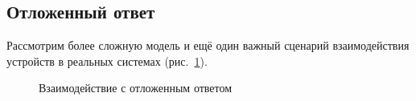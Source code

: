 % 
% 
% 
% 
% 

\subsection{Отложенный ответ}

Рассмотрим более сложную модель и ещё один важный сценарий взаимодействия устройств в реальных системах (рис. \ref{fig:delayed-response}).

\begin{figure}[htp]
    \centering
    \caption[Взаимодействие с отложенным ответом]{Взаимодействие с отложенным ответом}
    \label{fig:delayed-response}
\end{figure}

